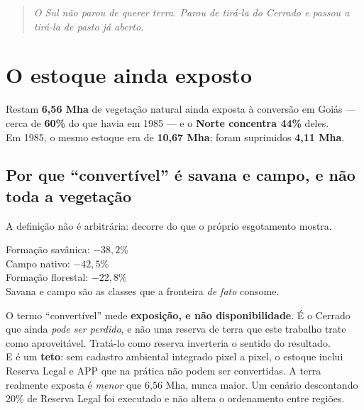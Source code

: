 \begin{quote}\itshape\color{cortinta}
O Sul não parou de querer terra. Parou de tirá-la do Cerrado e passou a tirá-la
de pasto já aberto.
\end{quote}

\section{O estoque ainda exposto}

\begin{ancora}
Restam \textbf{6,56 Mha} de vegetação natural ainda exposta à conversão em
Goiás --- cerca de \textbf{60\%} do que havia em 1985 --- e o \textbf{Norte
concentra 44\%} deles. \\
Em 1985, o mesmo estoque era de \textbf{10,67 Mha}; foram suprimidos
\textbf{4,11 Mha}.
\end{ancora}

\subsection{Por que ``convertível'' é savana e campo, e não toda a vegetação}

A definição não é arbitrária: decorre do que o próprio esgotamento mostra.

\begin{ancora}
Formação savânica: $-38{,}2\%$ \\
Campo nativo: $-42{,}5\%$ \\
Formação florestal: $-22{,}8\%$ \\[4pt]
Savana e campo são as classes que a fronteira \emph{de fato} consome.
\end{ancora}

\begin{naodiz}
O termo ``convertível'' mede \textbf{exposição, e não disponibilidade}. É o
Cerrado que ainda \emph{pode ser perdido}, e não uma reserva de terra que este
trabalho trate como aproveitável. Tratá-lo como reserva inverteria o sentido do
resultado. \\[4pt]
E é um \textbf{teto}: sem cadastro ambiental integrado pixel a pixel, o estoque
inclui Reserva Legal e APP que na prática não podem ser convertidas. A terra
realmente exposta é \emph{menor} que 6,56 Mha, nunca maior. Um cenário
descontando 20\% de Reserva Legal foi executado e não altera o ordenamento entre
regiões.
\end{naodiz}

